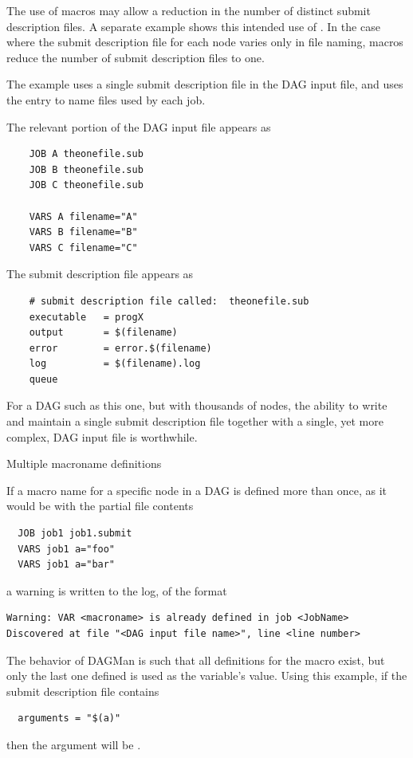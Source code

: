 The use of macros may allow a reduction in the number 
of distinct submit description files.
A separate example shows this intended use of .
In the case where the submit description file for each node
varies only in file naming, 
macros reduce the number of submit description files to one.

The example uses a single submit description file in the DAG input
file, and uses the  entry to name files used by each job.

The relevant portion of the DAG input file appears as 
\begin{verbatim}
    JOB A theonefile.sub
    JOB B theonefile.sub
    JOB C theonefile.sub

    VARS A filename="A"
    VARS B filename="B"
    VARS C filename="C"
\end{verbatim}

The submit description file appears as 
\footnotesize
\begin{verbatim}
    # submit description file called:  theonefile.sub
    executable   = progX
    output       = $(filename)
    error        = error.$(filename)
    log          = $(filename).log
    queue
\end{verbatim}
\normalsize

For a DAG such as this one, but with thousands of nodes,
the ability to write and maintain a single submit description file 
together with a single, yet more complex, DAG input file is worthwhile.

\begin{description}
\item[Multiple macroname definitions]
\end{description}

If a macro name for a specific node in a DAG is defined more than once,
as it would be with the partial file contents
\begin{verbatim}
  JOB job1 job1.submit
  VARS job1 a="foo"
  VARS job1 a="bar"
\end{verbatim}
a warning is written to the log, of the format 
\begin{verbatim}
Warning: VAR <macroname> is already defined in job <JobName>
Discovered at file "<DAG input file name>", line <line number>
\end{verbatim}

The behavior of DAGMan is such that all definitions for the macro exist,
but only the last one defined is used as the variable's value.
Using this example, 
if the  submit description file contains
\begin{verbatim}
  arguments = "$(a)"
\end{verbatim}
then the argument will be .

